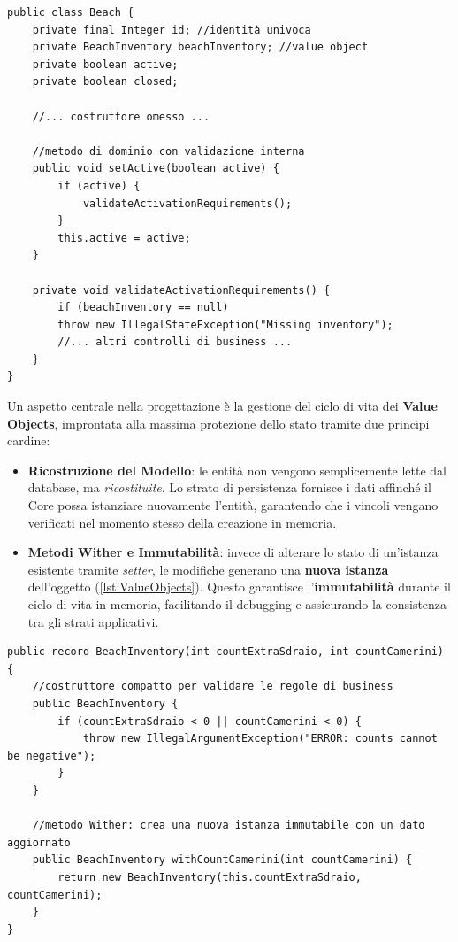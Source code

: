 \documentclass[a4paper,11pt]{article}
\begin{document}
\newpage

\begin{lstlisting}[caption={Esempio Entity (Integrità dello stato e logica di business)}, label={lst:Entities}]
public class Beach {
	private final Integer id; //identità univoca
	private BeachInventory beachInventory; //value object
	private boolean active;
	private boolean closed;
		
	//... costruttore omesso ...
		
	//metodo di dominio con validazione interna
	public void setActive(boolean active) {
		if (active) {
			validateActivationRequirements();
		}
		this.active = active;
	}
		
	private void validateActivationRequirements() {
		if (beachInventory == null)
		throw new IllegalStateException("Missing inventory");
		//... altri controlli di business ...
	}
}
\end{lstlisting}

Un aspetto centrale nella progettazione è la gestione del ciclo di vita dei \textbf{Value Objects}, improntata alla massima protezione dello stato tramite due principi cardine:

\begin{itemize}
	\item \textbf{Ricostruzione del Modello}: le entità non vengono semplicemente lette dal database, ma \textit{ricostituite}. Lo strato di persistenza fornisce i dati affinché il Core possa istanziare nuovamente l'entità, garantendo che i vincoli vengano verificati nel momento stesso della creazione in memoria.
	\item \textbf{Metodi Wither e Immutabilità}: invece di alterare lo stato di un'istanza esistente tramite \textit{setter}, le modifiche generano una \textbf{nuova istanza} dell'oggetto (\autoref{lst:ValueObjects}). Questo garantisce l'\textbf{immutabilità} durante il ciclo di vita in memoria, facilitando il debugging e assicurando la consistenza tra gli strati applicativi.
\end{itemize}

\begin{lstlisting}[caption={Value Object: Integrità alla creazione e pattern Wither}, label={lst:ValueObjects}]
public record BeachInventory(int countExtraSdraio, int countCamerini) {
	//costruttore compatto per validare le regole di business
	public BeachInventory {
		if (countExtraSdraio < 0 || countCamerini < 0) {
			throw new IllegalArgumentException("ERROR: counts cannot be negative");
		}
	}
		
	//metodo Wither: crea una nuova istanza immutabile con un dato aggiornato
	public BeachInventory withCountCamerini(int countCamerini) {
		return new BeachInventory(this.countExtraSdraio, countCamerini);
	}
}
\end{lstlisting}
\end{document}
